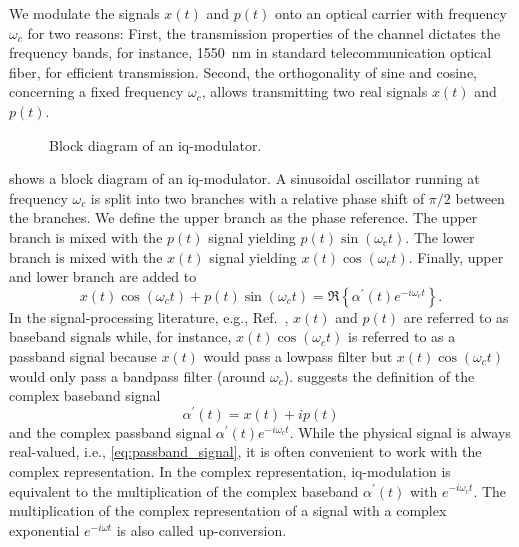 We modulate the signals $x(t)$ and $p(t)$ onto an optical carrier with frequency $\omega_c$ for two reasons:
First, the transmission properties of the channel dictates the frequency bands, for instance, \SI{1550}{\nano\meter} in standard telecommunication optical fiber, for efficient transmission.
Second, the orthogonality of sine and cosine, concerning a fixed frequency $\omega_c$, allows transmitting two real signals $x(t)$ and $p(t)$.
\begin{figure}[htb]
	\centering
	
	\caption{Block diagram of an \gls{iq}-modulator.}\label{fig:iqmod}
\end{figure}
 shows a block diagram of an \gls{iq}-modulator.
A sinusoidal oscillator running at frequency $\omega_c$ is split into two branches with a relative phase shift of $\pi/2$ between the branches.
We define the upper branch as the phase reference.
The upper branch is mixed with the $p(t)$ signal yielding $p(t)\sin(\omega_ct)$.
The lower branch is mixed with the $x(t)$ signal yielding $x(t)\cos(\omega_ct)$.
Finally, upper and lower branch are added to
\begin{equation}
	x(t)
	\cos(\omega_ct)
	+
	p(t)
	\sin(\omega_ct)
	=
	\Re\left\{
		\alpha^\prime(t)
		e^{-i\omega_ct}
	\right\}
	\label{eq:passband_signal}.
\end{equation}
In the signal-processing literature, e.g., Ref.~\cite[p.~25]{Madhow2008}, $x(t)$ and $p(t)$ are referred to as baseband signals while, for instance, $x(t)\cos(\omega_ct)$ is referred to as a passband signal because $x(t)$ would pass a lowpass filter but $x(t)\cos(\omega_ct)$ would only pass a bandpass filter (around $\omega_c$).
 suggests the definition of the complex baseband signal
\begin{equation}
	\alpha^\prime(t)
	=
	x(t)
	+
	ip(t)
\end{equation}
and the complex passband signal $\alpha^\prime(t)e^{-i\omega_ct}$.
While the physical signal is always real-valued, i.e., \cref{eq:passband_signal}, it is often convenient to work with the complex representation.
In the complex representation, \gls{iq}-modulation is equivalent to the multiplication of the complex baseband $\alpha^\prime(t)$ with $e^{-i\omega_ct}$.
The multiplication of the complex representation of a signal with a complex exponential $e^{-i\omega t}$ is also called up-conversion.


